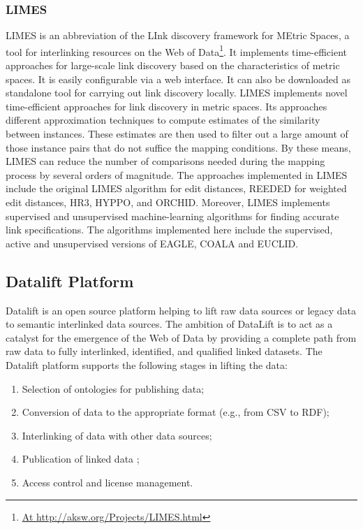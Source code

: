 \begin{itemize}
\subsubsection{LIMES}
LIMES is an abbreviation of the LInk discovery framework for MEtric Spaces, a tool for interlinking resources on the Web of Data\footnote{\url{At http://aksw.org/Projects/LIMES.html}}. It implements time-efficient approaches for large-scale link discovery based on the characteristics of metric spaces. It is easily configurable via a web interface. It can also be downloaded as standalone tool for carrying out link discovery locally.
LIMES implements novel time-efficient approaches for link discovery in metric spaces. Its approaches different approximation techniques to compute estimates of the similarity between instances. These estimates are then used to filter out a large amount of those instance pairs that do not suffice the mapping conditions. By these means, LIMES can reduce the number of comparisons needed during the mapping process by several orders of magnitude. The approaches implemented in LIMES include the original LIMES algorithm for edit distances, REEDED for weighted edit distances, HR3, HYPPO, and ORCHID. Moreover, LIMES implements supervised and unsupervised machine-learning algorithms for finding accurate link specifications. The algorithms implemented here include the supervised, active and unsupervised versions of EAGLE, COALA and EUCLID.

\subsection{Datalift Platform}
\label{sec:datalift}
Datalift is an open source platform \cite{scharffe_2012} helping to lift raw data sources or legacy data to semantic interlinked data sources.
The ambition of DataLift is to act as a catalyst for the emergence of the Web of Data by providing a complete path from raw data to fully interlinked, identified, and qualified linked datasets. The Datalift platform supports the following stages in lifting the data:
\begin{enumerate}
\item Selection of ontologies for publishing data;
\item Conversion of data to the appropriate format (e.g., from CSV to RDF);
\item Interlinking of data with other data sources;
\item Publication of linked data ;
\item Access control and license management.
\end{enumerate}


\end{itemize}
